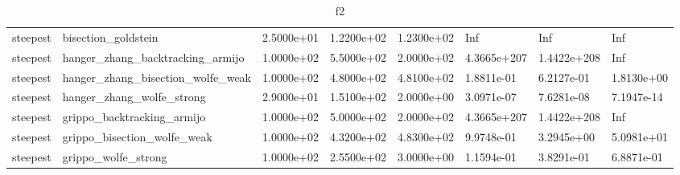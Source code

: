 \documentclass[a4paper,11pt]{article}
\numberwithin{equation}{section} %
\begin{document}
\begin{table}[h!]
{\begin{tabular}{|l|l|l|l|l|l|l|l|}
        steepest & bisection\_goldstein & 2.5000e+01 & 1.2200e+02 & 1.2300e+02 & Inf & Inf & Inf \\
        steepest & hanger\_zhang\_backtracking\_armijo & 1.0000e+02 & 5.5000e+02 & 2.0000e+02 & 4.3665e+207 & 1.4422e+208 & Inf \\
        steepest & hanger\_zhang\_bisection\_wolfe\_weak & 1.0000e+02 & 4.8000e+02 & 4.8100e+02 & 1.8811e-01 & 6.2127e-01 & 1.8130e+00 \\
        steepest & hanger\_zhang\_wolfe\_strong & 2.9000e+01 & 1.5100e+02 & 2.0000e+00 & 3.0971e-07 & 7.6281e-08 & 7.1947e-14 \\
        steepest & grippo\_backtracking\_armijo & 1.0000e+02 & 5.0000e+02 & 2.0000e+02 & 4.3665e+207 & 1.4422e+208 & Inf \\
        steepest & grippo\_bisection\_wolfe\_weak & 1.0000e+02 & 4.3200e+02 & 4.8300e+02 & 9.9748e-01 & 3.2945e+00 & 5.0981e+01 \\
        steepest & grippo\_wolfe\_strong & 1.0000e+02 & 2.5500e+02 & 3.0000e+00 & 1.1594e-01 & 3.8291e-01 & 6.8871e-01 \\

\end{tabular}}
\caption{f2}
\label{table:f2}
\end{table}
\end{document}
